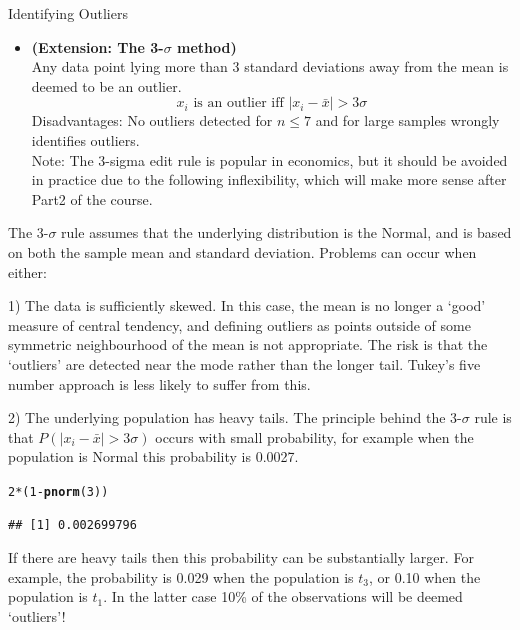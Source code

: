 \documentclass[t,xcolor=pdftex,dvipsnames,table]{beamer}\usepackage[]{graphicx}\usepackage[]{color}
\makeatletter
\newcommand{\hlnum}[1]{\textcolor[rgb]{0.686,0.059,0.569}{#1}}%
\newcommand{\hlopt}[1]{\textcolor[rgb]{0,0,0}{#1}}%
\newcommand{\hlstd}[1]{\textcolor[rgb]{0.345,0.345,0.345}{#1}}%
\newcommand{\hlkwd}[1]{\textcolor[rgb]{0.737,0.353,0.396}{\textbf{#1}}}%
\newenvironment{kframe}{%
 \def\at@end@of@kframe{}%
 \ifinner\ifhmode%
  \def\at@end@of@kframe{\end{minipage}}%
  \begin{minipage}{\columnwidth}%
 \fi\fi%
 \def\FrameCommand##1{\hskip\@totalleftmargin \hskip-\fboxsep
 \colorbox{shadecolor}{##1}\hskip-\fboxsep
     \hskip-\linewidth \hskip-\@totalleftmargin \hskip\columnwidth}%
 \MakeFramed {\advance\hsize-\width
   \@totalleftmargin\z@ \linewidth\hsize
   \@setminipage}}%
 {\par\unskip\endMakeFramed%
 \at@end@of@kframe}
\newenvironment{knitrout}{}{} %
\makeatother
\begin{document}
\begin{frame}[fragile]{Identifying Outliers}
\begin{itemize}
\item {\bf (Extension: The 3-$\sigma$ method)} \\
Any data point lying more than 3 standard deviations away from the mean is deemed to be an outlier. \\
\[ x_{i} \mbox{ is an outlier iff } |x_{i} - \bar{x}| > 3 \sigma  \]
Disadvantages:  No outliers detected for $n \leq 7$ and for large samples wrongly identifies outliers. \\

\vspace{.5cm}
Note: The 3-sigma edit rule is popular in economics, but it should be avoided in practice due to the following inflexibility, which will make more sense after Part2 of the course. 
\end{itemize}
\end{frame}

\begin{frame}[fragile]{}
The 3-$\sigma$ rule assumes that the underlying distribution is the Normal, and is based on both the sample mean and standard deviation. Problems can occur when either:

\vspace{.5cm}
1) The data is sufficiently skewed. In this case, the mean is no longer a `good' measure of central tendency, and defining outliers as points outside of some symmetric neighbourhood of the mean is not appropriate. The risk is that the `outliers' are detected near the mode rather than the longer tail. Tukey's five number approach is less likely to suffer from this.  
\end{frame}

\begin{frame}[fragile]{}
2) The underlying population has heavy tails. The principle behind the 3-$\sigma$ rule is that $P(  |x_{i} - \bar{x}| > 3 \sigma)$ occurs with small probability, for example when the population is Normal this probability is 0.0027. 

\begin{knitrout}
\color{fgcolor}\begin{kframe}
\begin{alltt}
\hlnum{2}\hlopt{*}\hlstd{(}\hlnum{1}\hlopt{-}\hlkwd{pnorm}\hlstd{(}\hlnum{3}\hlstd{))}
\end{alltt}
\begin{verbatim}
## [1] 0.002699796
\end{verbatim}
\end{kframe}
\end{knitrout}

\vspace{.5cm}
If there are heavy tails then this probability can be substantially larger. For example, the probability is 0.029 when the population is $t_{3}$, or 0.10 when the population is $t_{1}$. In the latter case 10\% of the observations will be deemed `outliers'!


\end{frame}
\end{document}
